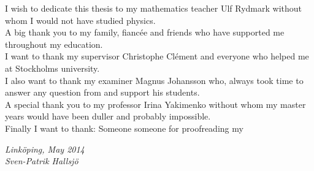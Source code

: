 \begin{acknowledgments}
I wish to dedicate this thesis to my mathematics teacher Ulf Rydmark without whom I would not have studied physics.\\
A big thank you to my family, fiancée and friends who have supported me throughout my education.\\
I want to thank my supervisor Christophe Clément and everyone who helped me at Stockholms university. \\
I also want to thank my examiner Magnus Johansson who, always took time to answer any question from and support his students. \\ 
A special thank you to my professor Irina Yakimenko without whom my master years would have been duller and probably impossible.\\
Finally I want to thank: Someone someone for proofreading my

  \addvspace{1em}
  \begin{flushright}
    \textit{%
      Linköping, May 2014\\
      Sven-Patrik Hallsjö%
    }
  \end{flushright}
\end{acknowledgments}
